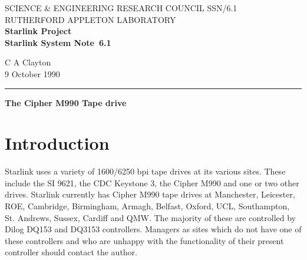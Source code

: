 \pagestyle{myheadings}

\newcommand{\stardoccategory}  {Starlink System Note}
\newcommand{\stardocinitials}  {SSN}
\newcommand{\stardocnumber}    {6.1}
\newcommand{\stardocauthors}   {C A Clayton}
\newcommand{\stardocdate}      {9 October 1990}
\newcommand{\stardoctitle}     {The Cipher M990 Tape drive}

\newcommand{\stardocname}{\stardocinitials /\stardocnumber}
\markright{\stardocname}
\setlength{\textwidth}{160mm}
\setlength{\textheight}{240mm}
\setlength{\topmargin}{-5mm}
\setlength{\oddsidemargin}{0mm}
\setlength{\evensidemargin}{0mm}
\setlength{\parindent}{0mm}
\setlength{\parskip}{\medskipamount}
\setlength{\unitlength}{1mm}


\thispagestyle{empty}
SCIENCE \& ENGINEERING RESEARCH COUNCIL \hfill \stardocname\\
RUTHERFORD APPLETON LABORATORY\\
{\large\bf Starlink Project\\}
{\large\bf \stardoccategory\ \stardocnumber}
\begin{flushright}
\stardocauthors\\
\stardocdate
\end{flushright}
\vspace{-4mm}
\rule{\textwidth}{0.5mm}
\vspace{5mm}
\begin{center}
{\Large\bf \stardoctitle}
\end{center}
\vspace{5mm}

\section{Introduction}

Starlink uses a variety of 1600/6250 bpi tape drives at its various sites.
These include the SI 9621, the CDC Keystone 3, the Cipher M990 and one or two
other drives.
Starlink currently has Cipher M990 tape drives at Manchester, Leicester, ROE,
Cambridge, Birmingham, Armagh, Belfast, Oxford, UCL, Southampton, St. Andrews,
Sussex, Cardiff and QMW. The majority of these are controlled by Dilog DQ153
and DQ3153 controllers. Managers as
sites which do not have one of these controllers and who
are unhappy with the functionality of their present controller should contact
the author.

